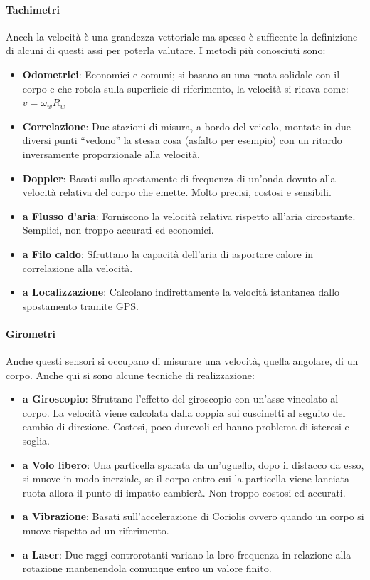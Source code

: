 \documentclass[12pt]{article}
\begin{document}
\paragraph{Tachimetri} Anceh la velocità è una grandezza vettoriale ma spesso è sufficente la definizione di alcuni di questi assi per poterla valutare. I metodi più conosciuti sono:
\begin{itemize}
  \item \textbf{Odometrici}: Economici e comuni; si basano su una ruota solidale con il corpo e che rotola sulla superficie di riferimento, la velocità si ricava come: $v=\omega_{w} R_{w}$
  \item \textbf{Correlazione}: Due stazioni di misura, a bordo del veicolo, montate in due diversi punti ``vedono'' la stessa cosa (asfalto per esempio) con un ritardo inversamente proporzionale alla velocità.
  \item \textbf{Doppler}: Basati sullo spostamente di frequenza di un'onda dovuto alla velocità relativa del corpo che emette. Molto precisi, costosi e sensibili.
  \item \textbf{a Flusso d'aria}: Forniscono la velocità relativa rispetto all'aria circostante. Semplici, non troppo accurati ed economici.
  \item \textbf{a Filo caldo}: Sfruttano la capacità dell'aria di asportare calore in correlazione alla velocità.
  \item \textbf{a Localizzazione}: Calcolano indirettamente la velocità istantanea dallo spostamento tramite GPS.
\end{itemize}

\paragraph{Girometri} Anche questi sensori si occupano di misurare una velocità, quella angolare, di un corpo. Anche qui si sono alcune tecniche di realizzazione:
\begin{itemize}
  \item \textbf{a Giroscopio}: Sfruttano l'effetto del giroscopio con un'asse vincolato al corpo. La velocità viene calcolata dalla coppia sui cuscinetti al seguito del cambio di direzione. Costosi, poco durevoli ed hanno problema di isteresi e soglia.
  \item \textbf{a Volo libero}: Una particella sparata da un'uguello, dopo il distacco da esso, si muove in modo inerziale, se il corpo entro cui la particella viene lanciata ruota allora il punto di impatto cambierà. Non troppo costosi ed accurati.
  \item \textbf{a Vibrazione}: Basati sull'accelerazione di Coriolis ovvero quando un corpo si muove rispetto ad un riferimento.
  \item \textbf{a Laser}: Due raggi controrotanti variano la loro frequenza in relazione alla rotazione mantenendola comunque entro un valore finito.
\end{itemize}




\end{document}
